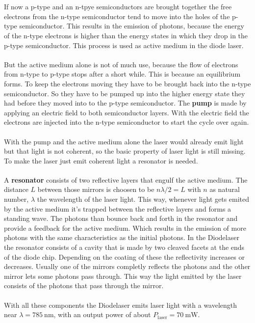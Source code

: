 \\\\
\FloatBarrier
If now a p-type and an n-tpye semiconductors are brought together the free electrons from the n-type semiconductor tend to move into the holes of the p-type semiconductor.
This results in the emission of photons, because the energy of the n-type electrons is higher than the energy states in which they drop in the p-type semiconductor.
This process is used as active medium in the diode laser.
\\\\
But the active medium alone is not of much use, because the flow of electrons from n-type to p-type stops after a short while.
This is because an equilibrium forms.
To keep the electrons moving they have to be brought back into the n-type semiconductor.
So they have to be pumped up into the higher energy state they had before they moved into to the p-type semiconductor.
The \textbf{pump} is made by applying an electric field to both semiconductor layers.
With the electric field the electrons are injected into the n-type semiconductor to start the cycle over again.
\\\\
With the pump and the active medium alone the laser would already emit light but that light is not coherent, so the basic property of laser light is still missing.
To make the laser just emit coherent light a resonator is needed.
\\\\
A \textbf{resonator} consists of two reflective layers that engulf the active medium.
The distance $L$ between those mirrors is choosen to be $n \lambda/2 = L$ with $n$ as natural number, $\lambda$ the wavelength of the laser light.
This way, whenever light gets emited by the active medium it's trapped between the reflective layers and forms a standing wave.
The photons than bounce back and forth in the resonator and provide a feedback for the active medium.
Which results in the emission of more photons with the same characteristics as the initial photons.
In the Diodelaser the resonator consists of a cavity that is made by two cleaved facets at the ends of the diode chip.
Depending on the coating of these the reflectivity increases or decreases.
Usually one of the mirrors completly reflects the photons and the other mirror lets some photons pass through.
This way the light emitted by the laser consists of the photons that pass through the mirror.
\\\\
With all these components the Diodelaser emits laser light with a wavelength near $\lambda = \SI{785}{\nano\meter}$, with an output power of about $P_\text{laser} = \SI{70}{\milli\W}$.

